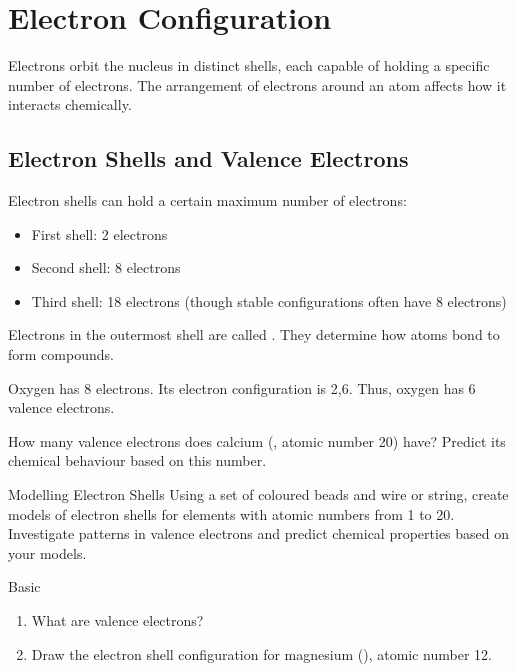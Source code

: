 \section{Electron Configuration}

Electrons orbit the nucleus in distinct shells, each capable of holding a specific number of electrons. The arrangement of electrons around an atom affects how it interacts chemically.

\subsection{Electron Shells and Valence Electrons}

Electron shells can hold a certain maximum number of electrons:

\begin{itemize}
	\item First shell: 2 electrons
	\item Second shell: 8 electrons
	\item Third shell: 18 electrons (though stable configurations often have 8 electrons)
\end{itemize}

Electrons in the outermost shell are called . They determine how atoms bond to form compounds.

\begin{example}
Oxygen has 8 electrons. Its electron configuration is 2,6. Thus, oxygen has 6 valence electrons.
\end{example}

\begin{stopandthink}
How many valence electrons does calcium (, atomic number 20) have? Predict its chemical behaviour based on this number.
\end{stopandthink}

\begin{investigation}{Modelling Electron Shells}
Using a set of coloured beads and wire or string, create models of electron shells for elements with atomic numbers from 1 to 20. Investigate patterns in valence electrons and predict chemical properties based on your models.
\end{investigation}

\begin{tieredquestions}{Basic}
\begin{enumerate}
	\item What are valence electrons?
	\item Draw the electron shell configuration for magnesium (), atomic number 12.
\end{enumerate}
\end{tieredquestions}

